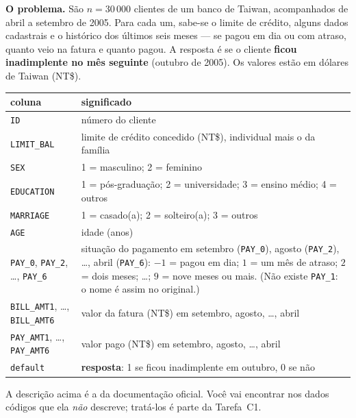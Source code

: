 \documentclass[11pt,a4paper]{article}
\newcommand{\cod}[1]{\texttt{#1}}
\begin{document}
\medskip\noindent\textbf{O problema.} São $n=30\,000$ clientes de um banco de
Taiwan, acompanhados de abril a setembro de 2005. Para cada um, sabe-se o limite de
crédito, alguns dados cadastrais e o histórico dos últimos seis meses --- se pagou
em dia ou com atraso, quanto veio na fatura e quanto pagou. A resposta é se o
cliente \textbf{ficou inadimplente no mês seguinte} (outubro de 2005). Os valores
estão em dólares de Taiwan (NT\$).
\begin{center}\small
\renewcommand{\arraystretch}{1.2}
\begin{tabular}{@{}lp{10.6cm}@{}}
\toprule
\textbf{coluna} & \textbf{significado} \\
\midrule
\cod{ID}          & número do cliente \\
\cod{LIMIT\_BAL}  & limite de crédito concedido (NT\$), individual mais o da família \\
\cod{SEX}         & 1 = masculino; 2 = feminino \\
\cod{EDUCATION}   & 1 = pós-graduação; 2 = universidade; 3 = ensino médio; 4 = outros \\
\cod{MARRIAGE}    & 1 = casado(a); 2 = solteiro(a); 3 = outros \\
\cod{AGE}         & idade (anos) \\
\cod{PAY\_0}, \cod{PAY\_2}, \dots, \cod{PAY\_6}
                  & situação do pagamento em setembro (\cod{PAY\_0}), agosto
                    (\cod{PAY\_2}), \dots, abril (\cod{PAY\_6}): $-1$ = pagou em dia;
                    $1$ = um mês de atraso; $2$ = dois meses; \dots; $9$ = nove meses
                    ou mais. (Não existe \cod{PAY\_1}: o nome é assim no original.) \\
\cod{BILL\_AMT1}, \dots, \cod{BILL\_AMT6}
                  & valor da fatura (NT\$) em setembro, agosto, \dots, abril \\
\cod{PAY\_AMT1}, \dots, \cod{PAY\_AMT6}
                  & valor pago (NT\$) em setembro, agosto, \dots, abril \\
\midrule
\cod{default}     & \textbf{resposta}: 1 se ficou inadimplente em outubro, 0 se não \\
\bottomrule
\end{tabular}
\end{center}

\noindent
A descrição acima é a da documentação oficial. Você vai encontrar nos dados códigos
que ela \emph{não} descreve; tratá-los é parte da Tarefa~C1.

\end{document}
